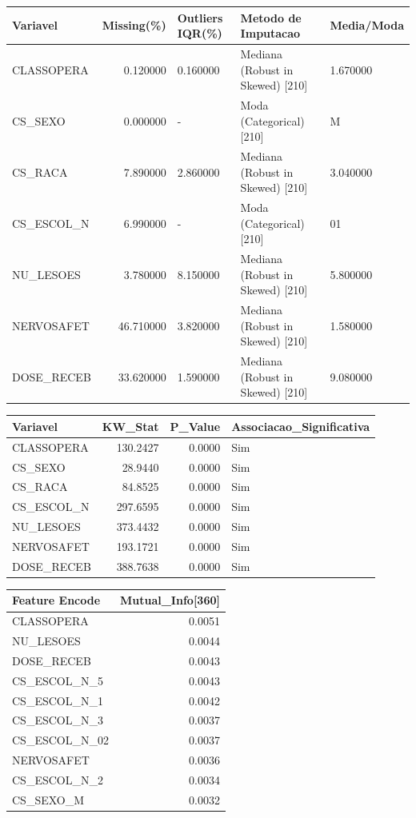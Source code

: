 \begin{tabular}{lrlll}
\toprule
Variavel & Missing(\%) & Outliers IQR(\%) & Metodo de Imputacao & Media/Moda \\
\midrule
CLASSOPERA & 0.120000 & 0.160000 & Mediana (Robust in Skewed) [210] & 1.670000 \\
CS\_SEXO & 0.000000 & - & Moda (Categorical) [210] & M \\
CS\_RACA & 7.890000 & 2.860000 & Mediana (Robust in Skewed) [210] & 3.040000 \\
CS\_ESCOL\_N & 6.990000 & - & Moda (Categorical) [210] & 01 \\
NU\_LESOES & 3.780000 & 8.150000 & Mediana (Robust in Skewed) [210] & 5.800000 \\
NERVOSAFET & 46.710000 & 3.820000 & Mediana (Robust in Skewed) [210] & 1.580000 \\
DOSE\_RECEB & 33.620000 & 1.590000 & Mediana (Robust in Skewed) [210] & 9.080000 \\
\bottomrule
\end{tabular}


\begin{tabular}{lrrl}
\toprule
Variavel & KW\_Stat & P\_Value & Associacao\_Significativa \\
\midrule
CLASSOPERA & 130.2427 & 0.0000 & Sim \\
CS\_SEXO & 28.9440 & 0.0000 & Sim \\
CS\_RACA & 84.8525 & 0.0000 & Sim \\
CS\_ESCOL\_N & 297.6595 & 0.0000 & Sim \\
NU\_LESOES & 373.4432 & 0.0000 & Sim \\
NERVOSAFET & 193.1721 & 0.0000 & Sim \\
DOSE\_RECEB & 388.7638 & 0.0000 & Sim \\
\bottomrule
\end{tabular}


\begin{tabular}{lr}
\toprule
Feature Encode & Mutual\_Info[360] \\
\midrule
CLASSOPERA & 0.0051 \\
NU\_LESOES & 0.0044 \\
DOSE\_RECEB & 0.0043 \\
CS\_ESCOL\_N\_5 & 0.0043 \\
CS\_ESCOL\_N\_1 & 0.0042 \\
CS\_ESCOL\_N\_3 & 0.0037 \\
CS\_ESCOL\_N\_02 & 0.0037 \\
NERVOSAFET & 0.0036 \\
CS\_ESCOL\_N\_2 & 0.0034 \\
CS\_SEXO\_M & 0.0032 \\
\bottomrule
\end{tabular}
